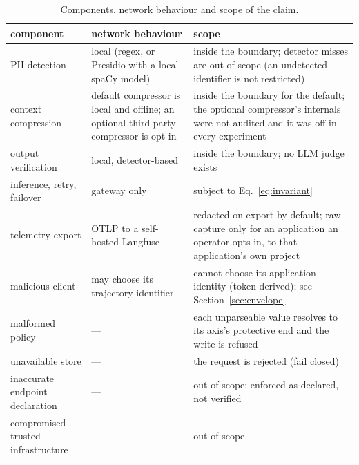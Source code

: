 \documentclass[11pt]{article}
\begin{document}
\begin{table}[t]
\centering
\small
\caption{Components, network behaviour and scope of the claim.}
\label{tab:threat}
\begin{tabular}{@{}p{3.4cm}p{5.0cm}p{6.3cm}@{}}
\toprule
component & network behaviour & scope \\
\midrule
PII detection & local (regex, or Presidio with a local spaCy model) & inside the boundary;
detector misses are out of scope (an undetected identifier is not restricted) \\
context compression & default compressor is local and offline; an optional third-party
compressor is opt-in & inside the boundary for the default; the optional compressor's internals
were not audited and it was off in every experiment \\
output verification & local, detector-based & inside the boundary; no LLM judge exists \\
inference, retry, failover & gateway only & subject to Eq.~\eqref{eq:invariant} \\
telemetry export & OTLP to a self-hosted Langfuse & redacted on export by default; raw capture
only for an application an operator opts in, to that application's own project \\
\midrule
malicious client & may choose its trajectory identifier & cannot choose its application
identity (token-derived); see Section~\ref{sec:envelope} \\
malformed policy & --- & each unparseable value resolves to its axis's protective end and the
write is refused \\
unavailable store & --- & the request is rejected (fail closed) \\
inaccurate endpoint declaration & --- & out of scope; enforced as declared, not verified \\
compromised trusted infrastructure & --- & out of scope \\
\bottomrule
\end{tabular}
\end{table}
\end{document}
